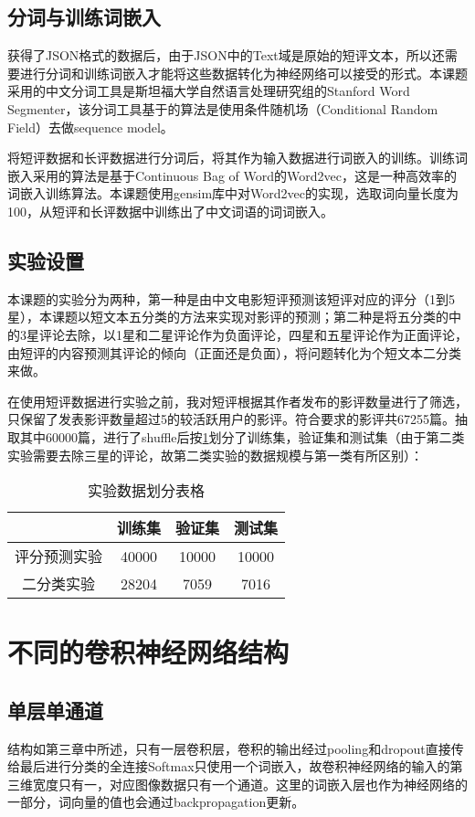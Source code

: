 \subsection{分词与训练词嵌入}
获得了JSON格式的数据后，由于JSON中的Text域是原始的短评文本，所以还需要进行分词和训练词嵌入才能将这些数据转化为神经网络可以接受的形式。本课题采用的中文分词工具是斯坦福大学自然语言处理研究组的Stanford Word Segmenter，该分词工具基于的算法是使用条件随机场（Conditional Random Field）去做sequence model。

将短评数据和长评数据进行分词后，将其作为输入数据进行词嵌入的训练。训练词嵌入采用的算法是基于Continuous Bag of Word的Word2vec，这是一种高效率的词嵌入训练算法。本课题使用gensim库中对Word2vec的实现，选取词向量长度为100，从短评和长评数据中训练出了中文词语的词词嵌入。

\subsection{实验设置}
本课题的实验分为两种，第一种是由中文电影短评预测该短评对应的评分（1到5星），本课题以短文本五分类的方法来实现对影评的预测；第二种是将五分类的中的3星评论去除，以1星和二星评论作为负面评论，四星和五星评论作为正面评论，由短评的内容预测其评论的倾向（正面还是负面），将问题转化为个短文本二分类来做。

在使用短评数据进行实验之前，我对短评根据其作者发布的影评数量进行了筛选，只保留了发表影评数量超过5的较活跃用户的影评。符合要求的影评共67255篇。抽取其中60000篇，进行了shuffle后按\ref{tab:data divide}划分了训练集，验证集和测试集（由于第二类实验需要去除三星的评论，故第二类实验的数据规模与第一类有所区别）：

\begin{table}
\centering
\caption{实验数据划分表格} \label{tab:data divide}
\begin{tabular}{c|c|c|c}
    \hline
     &训练集 & 验证集 & 测试集\\
    \hline
    评分预测实验 & 40000 & 10000 & 10000\\
    \hline
    二分类实验 & 28204 & 7059 & 7016\\
    \hline
\end{tabular}
\end{table}



\section{不同的卷积神经网络结构}
\subsection{单层单通道}
结构如第三章中所述，只有一层卷积层，卷积的输出经过pooling和dropout直接传给最后进行分类的全连接Softmax只使用一个词嵌入，故卷积神经网络的输入的第三维宽度只有一，对应图像数据只有一个通道。这里的词嵌入层也作为神经网络的一部分，词向量的值也会通过backpropagation更新。

